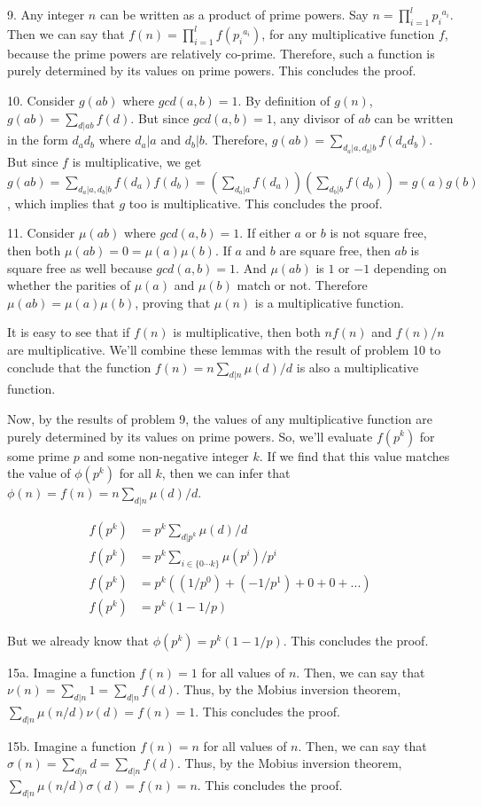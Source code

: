 \documentclass{article}
\begin{document}
9. Any integer $n$ can be written as a product of prime powers. Say $n = \prod_{i = 1}^l {p_i}^{a_i}$. Then we can say that $f(n) = \prod_{i = 1}^l f({p_i}^{a_i})$, for any multiplicative function $f$, because the prime powers are relatively co-prime. Therefore, such a function is purely determined by its values on prime powers. This concludes the proof.

10. Consider $g(ab)$ where $gcd(a, b) = 1$. By definition of $g(n)$, $g(ab) = \sum_{d | ab} f(d)$. But since $gcd(a, b) = 1$, any divisor of $ab$ can be written in the form $d_ad_b$ where $d_a | a$ and $d_b | b$. Therefore, $g(ab) = \sum_{d_a | a, d_b | b} f(d_ad_b)$. But since $f$ is multiplicative, we get $g(ab) = \sum_{d_a | a, d_b | b} f(d_a)f(d_b) = (\sum_{d_a | a} f(d_a))(\sum_{d_b | b} f(d_b)) = g(a)g(b)$, which implies that $g$ too is multiplicative. This concludes the proof.

11. Consider $\mu(ab)$ where $gcd(a, b) = 1$. If either $a$ or $b$ is not square free, then both $\mu(ab) = 0 = \mu(a)\mu(b)$. If $a$ and $b$ are square free, then $ab$ is square free as well because $gcd(a, b) = 1$. And $\mu(ab)$ is $1$ or $-1$ depending on whether the parities of $\mu(a)$ and $\mu(b)$ match or not. Therefore $\mu(ab) = \mu(a)\mu(b)$, proving that $\mu(n)$ is a multiplicative function.

It is easy to see that if $f(n)$ is multiplicative, then both $nf(n)$ and $f(n)/n$ are multiplicative. We'll combine these lemmas with the result of problem 10 to conclude that the function $f(n) = n \sum_{d | n} \mu(d) / d$ is also a multiplicative function.

Now, by the results of problem 9, the values of any multiplicative function are purely determined by its values on prime powers. So, we'll evaluate $f(p^k)$ for some prime $p$ and some non-negative integer $k$. If we find that this value matches the value of $\phi(p^k)$ for all $k$, then we can infer that $\phi(n) = f(n) = n \sum_{d | n} \mu(d) / d$.

\begin{align*}
    f(p^k) &= p^k \sum_{d | p^k} \mu(d) / d \\
    f(p^k) &= p^k \sum_{i \in \{0 \cdots k\}} \mu(p^i) / p^i \\
    f(p^k) &= p^k ((1 / p^0) + (-1 / p^1) + 0 + 0 + ...) \\
    f(p^k) &= p^k (1 - 1 / p)
\end{align*}

But we already know that $\phi(p^k) = p^k(1 - 1 / p)$. This concludes the proof.

15a. Imagine a function $f(n) = 1$ for all values of $n$. Then, we can say that $\nu(n) = \sum_{d | n} 1 = \sum_{d | n} f(d)$. Thus, by the Mobius inversion theorem, $\sum_{d | n} \mu(n/d)\nu(d) = f(n) = 1$. This concludes the proof. 

15b. Imagine a function $f(n) = n$ for all values of $n$. Then, we can say that $\sigma(n) = \sum_{d | n} d = \sum_{d | n} f(d)$. Thus, by the Mobius inversion theorem, $\sum_{d | n} \mu(n/d)\sigma(d) = f(n) = n$. This concludes the proof.
\end{document}
